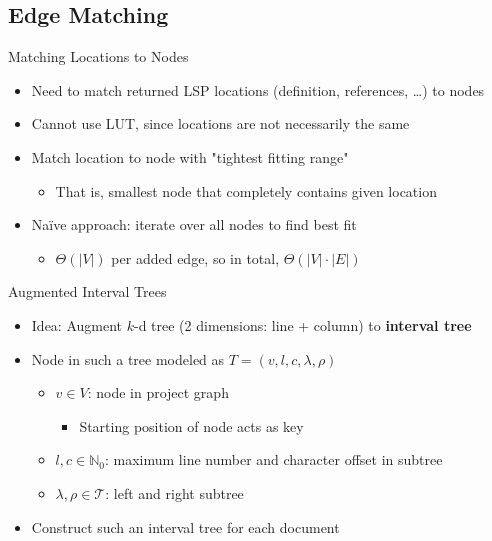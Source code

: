 \documentclass[xcolor={dvipsnames},aspectratio=169,compress,final]{beamer}
\newcommand{\follows}{\raisebox{-0.7mm}{\scalebox{1.4}{\textcolor{Maroon}{\ding{43}}}}}
\begin{document}
\subsection{Edge Matching}

\begin{frame}{Matching Locations to Nodes}
	\begin{itemize}
		\item Need to match returned LSP locations (definition, references, \dots) to nodes
		\item Cannot use LUT, since locations are not necessarily the same
		\item[\follows{}] Match location to node with "tightest fitting range"
		      \begin{itemize}
			      \item That is, smallest node that completely contains given location
		      \end{itemize}
		\item Naïve approach: iterate over all nodes to find best fit
		      \begin{itemize}
			      \item $\Theta(|V|)$ per added edge, so in total, $\Theta(|V| \cdot |E|)$
		      \end{itemize}
	\end{itemize}
\end{frame}

\begin{frame}{Augmented Interval Trees}
	\begin{itemize}
		\item Idea: Augment $k$-d tree (2 dimensions: line + column) to \textbf{interval tree}
		\item Node in such a tree modeled as $T = (v, l, c, \lambda, \rho)$
		      \begin{itemize}
			      \item $v \in V$: node in project graph
			            \begin{itemize}
				            \item Starting position of node acts as key
			            \end{itemize}
			      \item $l, c \in \mathbb{N}_0$: maximum line number and character offset in subtree
			      \item $\lambda, \rho \in \mathcal{T}$: left and right subtree
		      \end{itemize}
		\item Construct such an interval tree for each document
	\end{itemize}
\end{frame}
\end{document}
